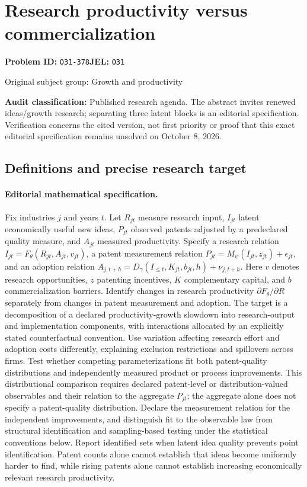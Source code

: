 \documentclass[11pt,a4paper]{article}
\begin{document}
\section*{Research productivity versus commercialization}
\textbf{Problem ID:} \texttt{O31-378}\quad \textbf{JEL:} \texttt{O31}\par
\label{problem:OP-0261}
{\sffamily\small\color{muted}Original subject group: Growth and productivity\par}
\label{definitions:problem:30007542}
\textbf{Audit classification:} Published research agenda. The abstract invites renewed ideas/growth research; separating three latent blocks is an editorial specification. Verification concerns the cited version, not first priority or proof that this exact editorial specification remains unsolved on October 8, 2026.
\subsection*{Definitions and precise research target}
\paragraph{Editorial mathematical specification.} Fix industries \(j\) and years \(t\). Let \(R_{jt}\) measure research input, \(I_{jt}\) latent economically useful new ideas, \(P_{jt}\) observed patents adjusted by a predeclared quality measure, and \(A_{jt}\) measured productivity. Specify a research relation \(I_{jt}=F_\theta(R_{jt},A_{jt},v_{jt})\), a patent measurement relation \(P_{jt}=M_\psi(I_{jt},z_{jt})+\epsilon_{jt}\), and an adoption relation \(A_{j,t+h}=D_\gamma(I_{\le t},K_{jt},b_{jt},h)+\nu_{j,t+h}\). Here \(v\) denotes research opportunities, \(z\) patenting incentives, \(K\) complementary capital, and \(b\) commercialization barriers.
Identify changes in research productivity \(\partial F_\theta/\partial R\) separately from changes in patent measurement and adoption. The target is a decomposition of a declared productivity-growth slowdown into research-output and implementation components, with interactions allocated by an explicitly stated counterfactual convention. Use variation affecting research effort and adoption costs differently, explaining exclusion restrictions and spillovers across firms. Test whether competing parameterizations fit both patent-quality distributions and independently measured product or process improvements. This distributional comparison requires declared patent-level or distribution-valued observables and their relation to the aggregate \(P_{jt}\); the aggregate alone does not specify a patent-quality distribution. Declare the measurement relation for the independent improvements, and distinguish fit to the observable law from structural identification and sampling-based testing under the statistical conventions below. Report identified sets when latent idea quality prevents point identification. Patent counts alone cannot establish that ideas become uniformly harder to find, while rising patents alone cannot establish increasing economically relevant research productivity.
\end{document}
